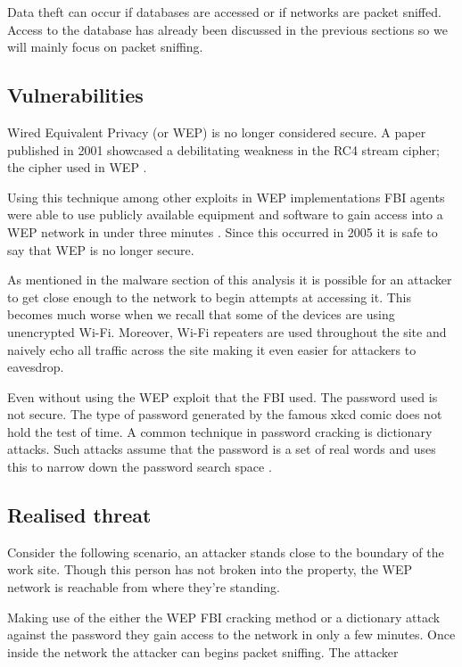 \documentclass{article}
\begin{document}
\begin{multicols}{2}
    Data theft can occur if databases are accessed or if networks are packet
    sniffed.
    Access to the database has already been discussed in the previous sections
    so we will mainly focus on packet sniffing.

    \subsection{Vulnerabilities}
    Wired Equivalent Privacy (or WEP)
    is no longer considered secure. A paper published in 2001 showcased a
    debilitating weakness in the RC4 stream cipher; the cipher used in WEP
    \cite{rc4}.

    Using this technique among other exploits in WEP implementations FBI agents were
    able to use publicly available equipment and software to 
    gain access into a WEP network in under three minutes \cite{fbi}. Since this
    occurred in 2005 it is safe to say that WEP is no longer secure.

    As mentioned in the malware section of this analysis it is possible for an
    attacker to get close enough to the network to begin attempts at accessing it.
    This becomes much worse when we recall that some of the devices are using
    unencrypted Wi-Fi.
    Moreover, Wi-Fi repeaters are used throughout the site and naively echo
    all traffic across the site making it even easier for attackers to
    eavesdrop.

    Even without using the WEP exploit that the FBI used. 
    The password used is not secure. The type of password generated by the famous
    xkcd comic does not hold the test of time. A common technique in
    password cracking is
    dictionary attacks. Such attacks assume that the password is a set of real
    words and uses this to narrow down the password search space \cite{xkcd}.

    \subsection{Realised threat}
    Consider the following scenario,
    an attacker stands close to the boundary of the work site. Though this 
    person has not broken into the property,
    the WEP network is reachable from where they're standing.
    
    Making use of the either the WEP FBI cracking method or a dictionary attack
    against the password they gain access to the network in only a few minutes.
    Once inside the network the attacker can begins packet sniffing.
    The attacker 


\end{multicols}
\end{document}
